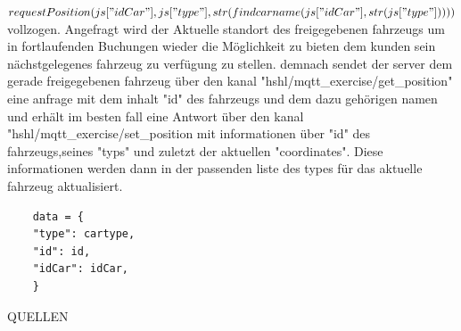 \documentclass[conference]{IEEEtran}
\begin{document}
\textit{$requestPosition(js["idCar"],js["type"],\\str(findcarname(js["idCar"],str(js["type"]))))$}
vollzogen.  Angefragt wird der Aktuelle standort des freigegebenen fahrzeugs um in fortlaufenden Buchungen wieder die Möglichkeit zu bieten dem kunden sein nächstgelegenes fahrzeug zu verfügung zu stellen. demnach sendet der server dem gerade freigegebenen fahrzeug über den kanal \textsf{"hshl/mqtt\_exercise/get\_position"} eine anfrage mit dem inhalt "id" des fahrzeugs und dem dazu gehörigen namen und erhält im besten fall  eine Antwort über den kanal  \textsf{"hshl/mqtt\_exercise/set\_position} mit informationen über "id" des fahrzeugs,seines "typs" und zuletzt der aktuellen "coordinates". Diese informationen werden dann in der passenden liste des types für das aktuelle fahrzeug aktualisiert.
\begin{lstlisting}
    data = {
    "type": cartype,
    "id": id,
    "idCar": idCar,
    }
\end{lstlisting}


\begin{thebibliography}{00}
 QUELLEN  
\end{thebibliography}
\vspace{12pt}
\end{document}
